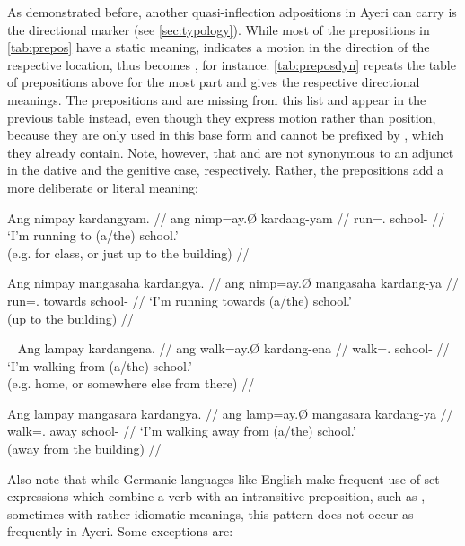 \label{manga}
As demonstrated before, another quasi-inflection adpositions in Ayeri can carry
is the directional marker  (see \autoref{sec:typology}). While
most of the prepositions in \autoref{tab:prepos} have a static meaning,
 indicates a motion in the direction of the respective
location, thus  becomes , for instance. \autoref{tab:preposdyn} repeats the table of
prepositions above for the most part and gives the respective directional
meanings. The prepositions  and 
are missing from this list and appear in the previous table instead, even
though they express motion rather than position, because they are only used in
this base form and cannot be prefixed by , which they already
contain. Note, however, that  and 
are not synonymous to an adjunct in the dative and the genitive case,
respectively. Rather, the prepositions add a more deliberate or literal
meaning:

\pex
\a\begingl
	\gla Ang nimpay kardangyam. //
	\glb ang nimp=ay.Ø kardang-yam //
	\glc \AgtT{} run=\Fsg{}.\Top{} school-\Dat{} //
	\glft `I'm running to (a/the) school.' \\
		(e.g. for class, or just up to the building) //
\endgl

\a\begingl
	\gla Ang nimpay mangasaha kardangya. //
	\glb ang nimp=ay.Ø mangasaha kardang-ya //
	\glc \AgtT{} run=\Fsg{}.\Top{} towards school-\Loc{} //
	\glft `I'm running towards (a/the) school.' \\
		(up to the building) //
\endgl
\xe

\pex~
\a\begingl
	\gla Ang lampay kardangena. //
	\glb ang walk=ay.Ø kardang-ena //
	\glc \AgtT{} walk=\Fsg{}.\Top{} school-\Gen{} //
	\glft `I'm walking from (a/the) school.' \\
		(e.g. home, or somewhere else from there) //
\endgl

\a\begingl
	\gla Ang lampay mangasara kardangya. //
	\glb ang lamp=ay.Ø mangasara kardang-ya //
	\glc \AgtT{} walk=\Fsg{}.\Top{} away school-\Loc{} //
	\glft `I'm walking away from (a/the) school.' \\
		(away from the building) //
\endgl
\xe

Also note that while Germanic languages like English make frequent use of set
expressions which combine a verb with an intransitive preposition, such as
, sometimes with rather idiomatic
meanings, this pattern does not occur as frequently in Ayeri. Some exceptions
are:

